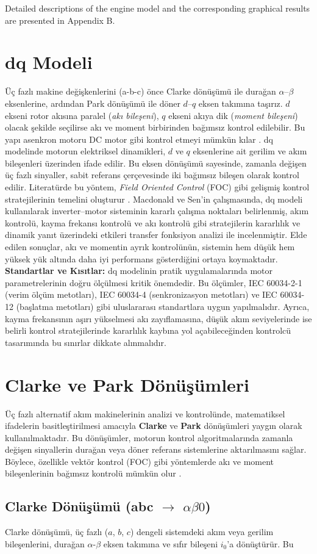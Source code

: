     Detailed descriptions of the engine model and the corresponding graphical results are presented in Appendix B.
    
\medskip

\section{dq Modeli} Üç fazlı makine değişkenlerini (a-b-c) önce Clarke dönüşümü ile durağan $\alpha$–$\beta$ eksenlerine, ardından Park dönüşümü ile döner $d$–$q$ eksen takımına taşırız. $d$ ekseni rotor akısına paralel (\textit{akı bileşeni}), $q$ ekseni akıya dik (\textit{moment bileşeni}) olacak şekilde seçilirse akı ve moment birbirinden bağımsız kontrol edilebilir. Bu yapı asenkron motoru DC motor gibi kontrol etmeyi mümkün kılar \cite{macdonald1979dq,leonhard1996control}. dq modelinde motorun elektriksel dinamikleri, $d$ ve $q$ eksenlerine ait gerilim ve akım bileşenleri üzerinden ifade edilir. Bu eksen dönüşümü sayesinde, zamanla değişen üç fazlı sinyaller, sabit referans çerçevesinde iki bağımsız bileşen olarak kontrol edilir. Literatürde bu yöntem, \textit{Field Oriented Control} (FOC) gibi gelişmiş kontrol stratejilerinin temelini oluşturur \cite{blashke1972,sen1989}. Macdonald ve Sen'in \cite{macdonald1979dq} çalışmasında, dq modeli kullanılarak inverter–motor sisteminin kararlı çalışma noktaları belirlenmiş, akım kontrolü, kayma frekansı kontrolü ve akı kontrolü gibi stratejilerin kararlılık ve dinamik yanıt üzerindeki etkileri transfer fonksiyon analizi ile incelenmiştir. Elde edilen sonuçlar, akı ve momentin ayrık kontrolünün, sistemin hem düşük hem yüksek yük altında daha iyi performans gösterdiğini ortaya koymaktadır. \textbf{Standartlar ve Kısıtlar:} dq modelinin pratik uygulamalarında motor parametrelerinin doğru ölçülmesi kritik önemdedir. Bu ölçümler, IEC 60034-2-1 (verim ölçüm metotları), IEC 60034-4 (senkronizasyon metotları) ve IEC 60034-12 (başlatma metotları) gibi uluslararası standartlara uygun yapılmalıdır. Ayrıca, kayma frekansının aşırı yükselmesi akı zayıflamasına, düşük akım seviyelerinde ise belirli kontrol stratejilerinde kararlılık kaybına yol açabileceğinden kontrolcü tasarımında bu sınırlar dikkate alınmalıdır. \section{Clarke ve Park Dönüşümleri} Üç fazlı alternatif akım makinelerinin analizi ve kontrolünde, matematiksel ifadelerin basitleştirilmesi amacıyla \textbf{Clarke} ve \textbf{Park} dönüşümleri yaygın olarak kullanılmaktadır. Bu dönüşümler, motorun kontrol algoritmalarında zamanla değişen sinyallerin durağan veya döner referans sistemlerine aktarılmasını sağlar. Böylece, özellikle vektör kontrol (FOC) gibi yöntemlerde akı ve moment bileşenlerinin bağımsız kontrolü mümkün olur \cite{blashke1972,leonhard1996control}. \subsection{Clarke Dönüşümü (abc $\rightarrow$ $\alpha\beta0$)} Clarke dönüşümü, üç fazlı ($a$, $b$, $c$) dengeli sistemdeki akım veya gerilim bileşenlerini, durağan $\alpha$-$\beta$ eksen takımına ve sıfır bileşeni $i_0$’a dönüştürür. Bu 